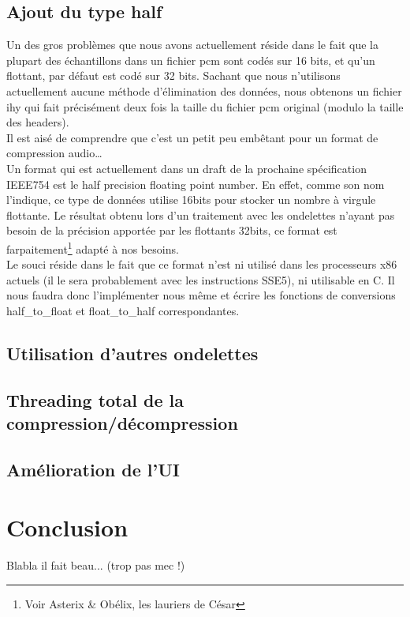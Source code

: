 \documentclass[a4paper,12pt]{article}
\begin{document}
	\subsection{Ajout du type half}
Un des gros problèmes que nous avons actuellement réside dans le fait que la
plupart des échantillons dans un fichier pcm sont codés sur 16 bits, et qu'un
flottant, par défaut est codé sur 32 bits. Sachant que nous n'utilisons
actuellement aucune méthode d'élimination des données, nous obtenons un
fichier ihy qui fait précisément deux fois la taille du fichier pcm original
(modulo la taille des headers).\\
Il est aisé de comprendre que c'est un petit peu embêtant pour un format de
compression audio\ldots\\
Un format qui est actuellement dans un draft de la prochaine spécification
IEEE754 est le half precision floating point number. En effet, comme son nom
l'indique, ce type de données utilise 16bits pour stocker un nombre à virgule
flottante. Le résultat obtenu lors d'un traitement avec les ondelettes n'ayant
pas besoin de la précision apportée par les flottants 32bits, ce format est
farpaitement\footnote{Voir Asterix \& Obélix, les lauriers de César} adapté à nos
besoins.\\
Le souci réside dans le fait que ce format n'est ni utilisé dans les processeurs
x86 actuels (il le sera probablement avec les instructions SSE5), ni utilisable
en C. Il nous faudra donc l'implémenter nous même et écrire les fonctions de
conversions half\_to\_float et float\_to\_half correspondantes.

	\subsection{Utilisation d'autres ondelettes}

	\subsection{Threading total de la compression/décompression}

	\subsection{Amélioration de l'UI}

\newpage

\section*{Conclusion}
Blabla il fait beau... (trop pas mec !)
\end{document}
